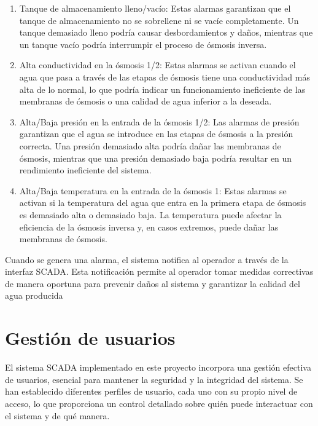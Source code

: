 \begin{enumerate}
		\item Tanque de almacenamiento lleno/vacío: Estas alarmas garantizan que el tanque de almacenamiento no se sobrellene ni se vacíe completamente. Un tanque demasiado lleno podría causar desbordamientos y daños, mientras que un tanque vacío podría interrumpir el proceso de ósmosis inversa.

		\item 	Alta conductividad en la ósmosis 1/2: Estas alarmas se activan cuando el agua que pasa a través de las etapas de ósmosis tiene una conductividad más alta de lo normal, lo que podría indicar un funcionamiento ineficiente de las membranas de ósmosis o una calidad de agua inferior a la deseada.

		\item Alta/Baja presión en la entrada de la ósmosis 1/2: Las alarmas de presión garantizan que el agua se introduce en las etapas de ósmosis a la presión correcta. Una presión demasiado alta podría dañar las membranas de ósmosis, mientras que una presión demasiado baja podría resultar en un rendimiento ineficiente del sistema.

		\item Alta/Baja temperatura en la entrada de la ósmosis 1: Estas alarmas se activan si la temperatura del agua que entra en la primera etapa de ósmosis es demasiado alta o demasiado baja. La temperatura puede afectar la eficiencia de la ósmosis inversa y, en casos extremos, puede dañar las membranas de ósmosis.
	
	\end{enumerate}




Cuando se genera una alarma, el sistema notifica al operador a través de la interfaz SCADA. Esta notificación permite al operador tomar medidas correctivas de manera oportuna para prevenir daños al sistema y garantizar la calidad del agua producida
	




\section{Gestión de usuarios}

El sistema SCADA implementado en este proyecto incorpora una gestión efectiva de usuarios, esencial para mantener la seguridad y la integridad del sistema. Se han establecido diferentes perfiles de usuario, cada uno con su propio nivel de acceso, lo que proporciona un control detallado sobre quién puede interactuar con el sistema y de qué manera.\\


